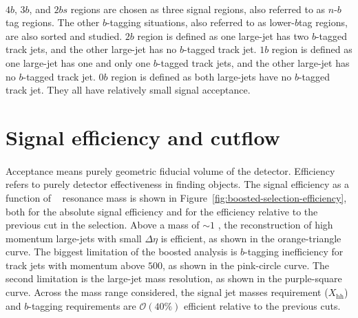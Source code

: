 \paragraph{}
$4b$, $3b$, and $2bs$ regions are chosen as three signal regions, also referred to as $n$-$b$tag regions.
The other $b$-tagging situations, also referred to as lower-$b$tag regions, are also sorted and studied.
$2b$ region is defined as one large-\R jet has two $b$-tagged track jets, and the other large-\R jet has no $b$-tagged track jet. 
$1b$ region is defined as one large-\R jet has one and only one $b$-tagged track jets, and the other large-\R jet has no $b$-tagged track jet. 
$0b$ region is defined as both large-\R jets have no $b$-tagged track jet. 
They all have relatively small signal acceptance. 



\section{Signal efficiency and cutflow}
\paragraph{}
Acceptance means purely geometric fiducial volume of the detector. Efficiency refers to purely detector effectiveness in finding objects.
The signal efficiency as a function of \Grav~ resonance mass is shown in Figure~\ref{fig:boosted-selection-efficiency}, both for the absolute signal efficiency and for the efficiency relative to the previous cut in the selection.
Above a mass of $\sim\!1$ \TeV, the reconstruction of high momentum large-\R jets with small $\Delta\eta$ is efficient, as shown in the orange-triangle curve.
The biggest limitation of the boosted analysis is $b$-tagging inefficiency for track jets with momentum above $500$\GeV, as shown in the pink-circle curve.
The second limitation is the large-\R jet mass resolution, as shown in the purple-square curve.
Across the mass range considered, the signal jet masses requirement ($X_\text{hh}$) and $b$-tagging requirements are $\mathcal{O}(40\%)$ efficient relative to the previous cuts.

